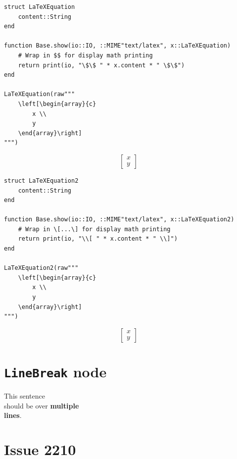 \begin{verbatim}
struct LaTeXEquation
    content::String
end

function Base.show(io::IO, ::MIME"text/latex", x::LaTeXEquation)
    # Wrap in $$ for display math printing
    return print(io, "\$\$ " * x.content * " \$\$")
end

LaTeXEquation(raw"""
    \left[\begin{array}{c}
        x \\
        y
    \end{array}\right]
""")
\end{verbatim}

$$     \left[\begin{array}{c}
        x \\
        y
    \end{array}\right]
 $$


\begin{verbatim}
struct LaTeXEquation2
    content::String
end

function Base.show(io::IO, ::MIME"text/latex", x::LaTeXEquation2)
    # Wrap in \[...\] for display math printing
    return print(io, "\\[ " * x.content * " \\]")
end

LaTeXEquation2(raw"""
    \left[\begin{array}{c}
        x \\
        y
    \end{array}\right]
""")
\end{verbatim}

\[     \left[\begin{array}{c}
        x \\
        y
    \end{array}\right]
 \]

\section{\texttt{LineBreak} node}



\label{17897388775242405248}{}


This sentence\\
should be over \textbf{multiple\\
lines}.



\section{Issue 2210}



